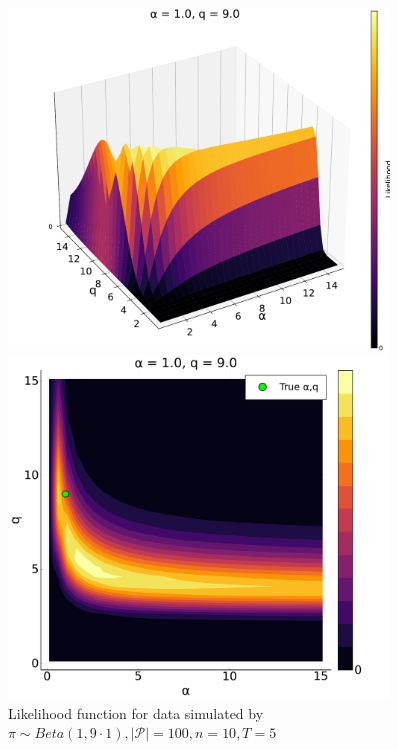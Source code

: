\documentclass[a4paper, 12pt]{article}
\begin{document}
\begin{figure}
    \centering
    \begin{minipage}{0.55\textwidth}
        \centering
        \includegraphics[width=0.9\textwidth]{../figures/Likelihood_sfplt_1.0.pdf} %
    \end{minipage}\hfill
    \begin{minipage}{0.45\textwidth}
        \centering
        \includegraphics[width=0.9\textwidth]{../figures/Likelihood_contplt_1.0.pdf} %
    \end{minipage}
    \caption{\small Likelihood function for data simulated by $\pi \sim Beta(1, 9 \cdot 1), |\mathcal{P}| = 100, n = 10, T = 5$}
\end{figure}
\end{document}
